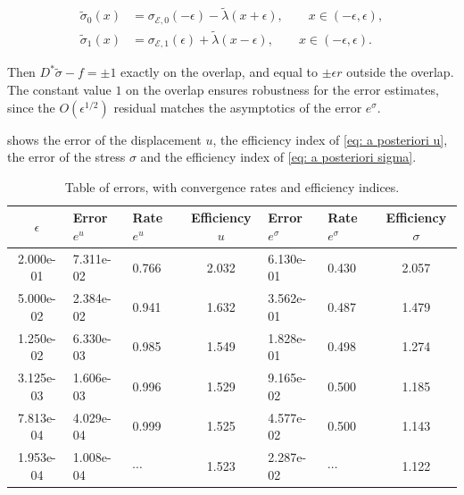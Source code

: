 \documentclass[reqno]{amsart}
\numberwithin{equation}{section}
\theoremstyle{definition}
\newcommand{\Ec}{\mathcal{E}}
\begin{document}
\begin{subequations}    
\begin{align}
\tilde{\sigma}_0(x) &= \sigma_{\Ec,0}(-\epsilon) - \tilde\lambda(x+\epsilon), \qquad x\in (-\epsilon, \epsilon), \\
\tilde{\sigma}_1(x) &= \sigma_{\Ec,1}(\epsilon) + \tilde\lambda(x-\epsilon), \qquad x\in (-\epsilon, \epsilon). 
\end{align}
\end{subequations}

Then $D^*\tilde\sigma - f  = \pm 1$ exactly on the overlap, and equal to $\pm\epsilon r$ outside the overlap. The constant value $1$ on the overlap ensures robustness for the error estimates, since the $O(\epsilon^{1/2})$ residual matches the asymptotics of the error $e^\sigma$.


 shows the error of the displacement $u$, the efficiency index of \cref{eq: a posteriori u}, the error of the stress $\sigma$ and the efficiency index of \cref{eq: a posteriori sigma}.

\begin{table}[ht]
\centering
\caption{Table of errors, with convergence rates and efficiency indices.}
\label{tab: error data}
\small
\begin{tabular}{c p{1.4cm} p{1.4cm} c p{1.4cm} p{1.4cm} c}
\toprule
$\epsilon$ & Error $e^u$ & Rate $e^u$ & Efficiency $u$ & Error $e^\sigma$ & Rate $e^\sigma$ & Efficiency $\sigma$ \\
\midrule
2.000e-01 & 7.311e-02 & 0.766 & 2.032 & 6.130e-01 & 0.430 & 2.057 \\
5.000e-02 & 2.384e-02 & 0.941 & 1.632 & 3.562e-01 & 0.487 & 1.479 \\
1.250e-02 & 6.330e-03 & 0.985 & 1.549 & 1.828e-01 & 0.498 & 1.274 \\
3.125e-03 & 1.606e-03 & 0.996 & 1.529 & 9.165e-02 & 0.500 & 1.185 \\
7.813e-04 & 4.029e-04 & 0.999 & 1.525 & 4.577e-02 & 0.500 &  1.143 \\
1.953e-04 & 1.008e-04 & $\cdots$ & 1.523 & 2.287e-02 & $\cdots$ & 1.122 \\
\bottomrule
\end{tabular}
\end{table}
\end{document}
